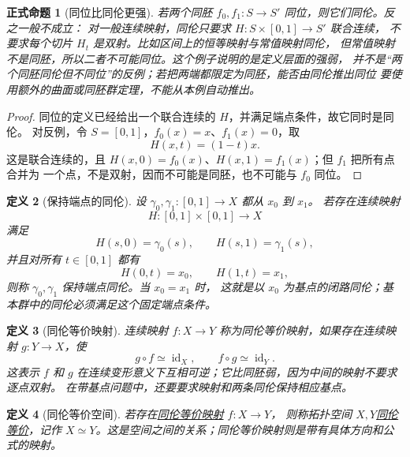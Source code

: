 \documentclass[UTF8,fontset=none,a4paper,11pt]{ctexart}
\theoremstyle{foundation-definition}
\newtheorem{definition}{定义}[section]
\theoremstyle{foundation-theorem}
\theoremstyle{foundation-proposition}
\newtheorem{proposition}[definition]{正式命题}
\theoremstyle{foundation-example}
\theoremstyle{foundation-remark}
\theoremstyle{foundation-theorem}
\newcommand{\term}[2]{\hyperref[#1]{#2}}
\begin{document}
\begin{proposition}[同位比同伦更强]
\label{prop:isotopy-implies-homotopy-not-converse}
若两个同胚 \(f_0,f_1:S\to S'\) 同位，则它们同伦。反之一般不成立：
对一般连续映射，同伦只要求 \(H:S\times[0,1]\to S'\) 联合连续，
不要求每个切片 \(H_t\) 是双射。比如区间上的恒等映射与常值映射同伦，
但常值映射不是同胚，所以二者不可能同位。这个例子说明的是定义层面的强弱，
并不是“两个同胚同伦但不同位”的反例；若把两端都限定为同胚，能否由同伦推出同位
要使用额外的曲面或同胚群定理，不能从本例自动推出。
\end{proposition}

\begin{proof}
同位的定义已经给出一个联合连续的 \(H\)，并满足端点条件，故它同时是同伦。
对反例，令 \(S=[0,1]\)，\(f_0(x)=x\)、\(f_1(x)=0\)，取
\[
H(x,t)=(1-t)x.
\]
这是联合连续的，且 \(H(x,0)=f_0(x)\)、\(H(x,1)=f_1(x)\)；但 \(f_1\) 把所有点合并为
一个点，不是双射，因而不可能是同胚，也不可能与 \(f_0\) 同位。
\end{proof}

\begin{definition}[保持端点的同伦]\label{def:fixed-endpoint-homotopy}
设 \(\gamma_0,\gamma_1:[0,1]\to X\) 都从 \(x_0\) 到 \(x_1\)。
若存在连续映射
\[
H:[0,1]\times[0,1]\to X
\]
满足
\[
H(s,0)=\gamma_0(s),\qquad H(s,1)=\gamma_1(s),
\]
并且对所有 \(t\in[0,1]\) 都有
\[
H(0,t)=x_0,\qquad H(1,t)=x_1,
\]
则称 \(\gamma_0,\gamma_1\) 保持端点同伦。当 \(x_0=x_1\) 时，
这就是以 \(x_0\) 为基点的闭路同伦；基本群中的同伦必须满足这个固定端点条件。
\end{definition}

\begin{definition}[同伦等价映射]\label{def:homotopy-equivalence}
连续映射 \(f:X\to Y\) 称为同伦等价映射，如果存在连续映射 \(g:Y\to X\)，使
\[
g\circ f\simeq\operatorname{id}_X,\qquad
f\circ g\simeq\operatorname{id}_Y.
\]
这表示 \(f\) 和 \(g\) 在连续变形意义下互相可逆；它比同胚弱，因为中间的映射不要求逐点双射。
在带基点问题中，还要要求映射和两条同伦保持相应基点。
\end{definition}

\begin{definition}[同伦等价空间]\label{def:homotopy-equivalent-spaces}
若存在\term{def:homotopy-equivalence}{同伦等价映射} \(f:X\to Y\)，
则称拓扑空间 \(X,Y\)\term{def:homotopy-equivalent-spaces}{同伦等价}，记作
\(X\simeq Y\)。这是空间之间的关系；同伦等价映射则是带有具体方向和公式的映射。
\end{definition}
\end{document}
